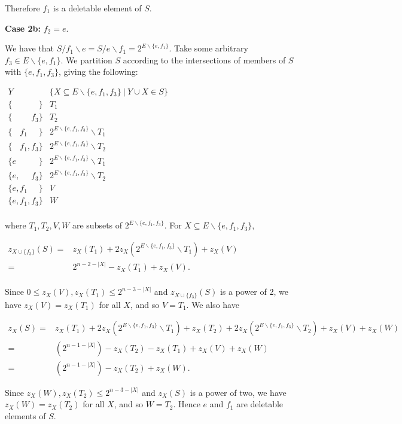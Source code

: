 \documentclass[10pt]{article}
\theoremstyle{definition}
\begin{document}
 Therefore $f_1$ is a deletable element of $S$. 

 
 \textbf{Case 2b:} $f_2=e$.
 
We have that $S/f_1\backslash e = S/e\backslash f_1 = 2^{E\backslash\{e,f_1\}}$. Take some arbitrary $f_3\in E\backslash\{e,f_1\}$. We partition $S$ according to the intersections of members of $S$ with $\{e,f_1,f_3\}$, giving the following:	
 \begin{center}
    $
 	\begin{array} {c|c}
 	Y & \{X\subseteq E\backslash\{e,f_1,f_3\}\ |\ Y\cup X \in S\}   \\
 	\hline
 	\{\phantom{e}\phantom{,}\phantom{f_1}\phantom{,}\phantom{f_3}\} & T_1	\\
 	\{\phantom{e,}\phantom{f_1,}{f_3}\} & T_2   \\
 	\{\phantom{e,}{f_1}\phantom{,}\phantom{f_3}\} & 2^{E\backslash\{e,f_1,f_3\}}\backslash T_1	\\	
 	\{\phantom{e,}{f_1,}{f_3}\}         & 2^{E\backslash\{e,f_1,f_3\}}\backslash T_2	\\	
 	\{{e}\phantom{,}\phantom{f_1}\phantom{,}\phantom{f_3}\}   & 2^{E\backslash\{e,f_1,f_3\}}\backslash T_1	\\	
 	\{{e}{,}\phantom{f_1}\phantom{,}{f_3}\}         & 2^{E\backslash\{e,f_1,f_3\}}\backslash T_2	\\
 	\{{e}{,}{f_1}\phantom{,}\phantom{f_3}\}           & V	\\
 	\{{e}{,}{f_1}{,}{f_3}\}                    & W	\\
 	\end{array}
 	$
\end{center}
where $T_1, T_2,V,W$ are subsets of $2^{E\backslash\{e,f_1,f_3\}}$.
For $X\subseteq E\backslash\{e,f_1,f_3\}$, \begin{center}
 	$
 	\begin{array} {rl}
 	z_{X\cup\{f_3\}}(S)	=	&	z_X({T_1})+2z_X(2^{E\backslash\{e,f_1,f_3\}}\backslash T_1)+z_X(V)			\\
 	=	&	2^{n-2-|X|}-z_X({T_1})+z_X(V).\\
 	\end{array}
 	$
 \end{center}
 Since $0\leq z_X(V),z_X({T_1})\leq 2^{n-3-|X|}$ and $z_{X\cup\{f_3\}}(S)$ is a power of 2, we have $z_X(V)=z_{X}({T_1})$ for all $X$, and so $V=T_1$. We also have
 \begin{center}
 	$
 	\begin{array} {rl}
 	z_X(S)	=	&	z_X({T_1})+2z_X(2^{E\backslash\{e,f_1,f_3\}}\backslash T_1)+z_X({T_2})+2z_X(2^{E\backslash\{e,f_1,f_3\}}\backslash T_2)+z_X(V)+z_X(W)		\\
 	=	&	(2^{n-1-|X|})-z_{X}(T_2)-z_X(T_1)+z_X(V)+z_{X}(W)\\
 	= &(2^{n-1-|X|})-z_{X}(T_2)+z_{X}(W).
 	\end{array}
 	$
 \end{center} 
 Since $z_X(W),z_X({T_2})\leq 2^{n-3-|X|}$ and $z_X(S)$ is a power of two, we have $z_X(W)=z_X(T_2)$ for all $X$, and so $W=T_2$. Hence $e$ and $f_1$ are deletable elements of $S$.
 
\end{document}
